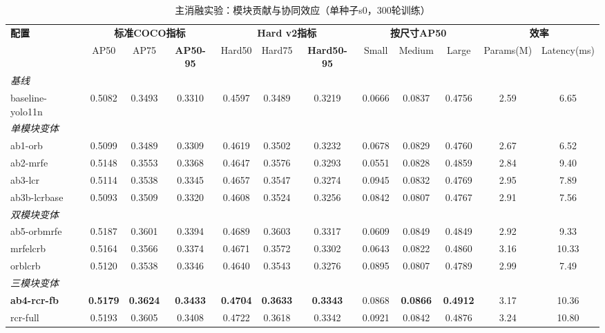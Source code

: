 
\begin{table}[t]
\centering
\caption{主消融实验：模块贡献与协同效应（单种子s0，300轮训练）}
\label{tab:ablation}
\begin{tabular}{l|ccc|ccc|ccc|cc}
\hline
\multirow{2}{*}{\textbf{配置}} & \multicolumn{3}{c|}{\textbf{标准COCO指标}} & \multicolumn{3}{c|}{\textbf{Hard v2指标}} & \multicolumn{3}{c|}{\textbf{按尺寸AP50}} & \multicolumn{2}{c}{\textbf{效率}} \\
& AP50 & AP75 & \textbf{AP50-95} & Hard50 & Hard75 & \textbf{Hard50-95} & Small & Medium & Large & Params(M) & Latency(ms) \\
\hline
\hline
\multicolumn{12}{l}{\textit{基线}} \\
baseline-yolo11n & 0.5082 & 0.3493 & 0.3310 & 0.4597 & 0.3489 & 0.3219 & 0.0666 & 0.0837 & 0.4756 & 2.59 & 6.65 \\
\hline
\multicolumn{12}{l}{\textit{单模块变体}} \\
ab1-orb & 0.5099 & 0.3489 & 0.3309 & 0.4619 & 0.3502 & 0.3232 & 0.0678 & 0.0829 & 0.4760 & 2.67 & 6.52 \\
ab2-mrfe & 0.5148 & 0.3553 & 0.3368 & 0.4647 & 0.3576 & 0.3293 & 0.0551 & 0.0828 & 0.4859 & 2.84 & 9.40 \\
ab3-lcr & 0.5114 & 0.3538 & 0.3345 & 0.4657 & 0.3547 & 0.3274 & 0.0945 & 0.0832 & 0.4769 & 2.95 & 7.89 \\
ab3b-lcrbase & 0.5093 & 0.3509 & 0.3320 & 0.4608 & 0.3524 & 0.3256 & 0.0842 & 0.0807 & 0.4767 & 2.91 & 7.56 \\
\hline
\multicolumn{12}{l}{\textit{双模块变体}} \\
ab5-orbmrfe & 0.5187 & 0.3601 & 0.3394 & 0.4689 & 0.3603 & 0.3317 & 0.0609 & 0.0849 & 0.4849 & 2.92 & 9.33 \\
mrfelcrb & 0.5164 & 0.3566 & 0.3374 & 0.4671 & 0.3572 & 0.3302 & 0.0643 & 0.0822 & 0.4860 & 3.16 & 10.33 \\
orblcrb & 0.5120 & 0.3538 & 0.3346 & 0.4640 & 0.3543 & 0.3276 & 0.0895 & 0.0807 & 0.4789 & 2.99 & 7.49 \\
\hline
\multicolumn{12}{l}{\textit{三模块变体}} \\
\textbf{ab4-rcr-fb} & \textbf{0.5179} & \textbf{0.3624} & \textbf{0.3433} & \textbf{0.4704} & \textbf{0.3633} & \textbf{0.3343} & 0.0868 & \textbf{0.0866} & \textbf{0.4912} & 3.17 & 10.36 \\
rcr-full & 0.5193 & 0.3605 & 0.3408 & 0.4722 & 0.3618 & 0.3342 & 0.0921 & 0.0842 & 0.4876 & 3.24 & 10.80 \\

\end{tabular}
\end{table}
